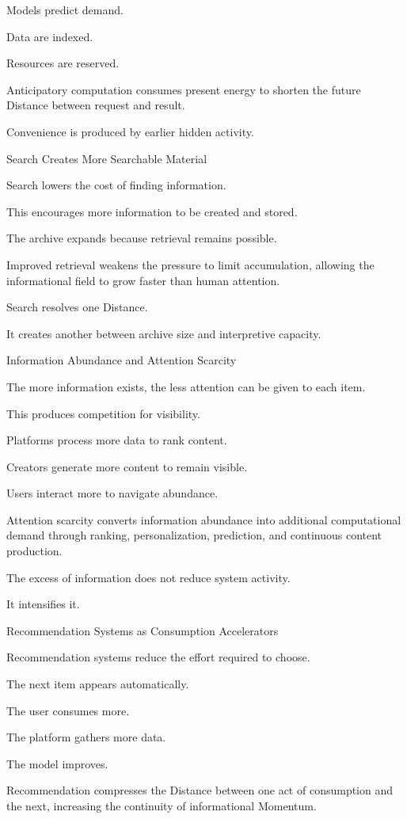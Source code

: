 Models predict demand.

Data are indexed.

Resources are reserved.

Anticipatory computation consumes present energy to shorten the future Distance between request and result.

Convenience is produced by earlier hidden activity.

Search Creates More Searchable Material

Search lowers the cost of finding information.

This encourages more information to be created and stored.

The archive expands because retrieval remains possible.

Improved retrieval weakens the pressure to limit accumulation, allowing the informational field to grow faster than human attention.

Search resolves one Distance.

It creates another between archive size and interpretive capacity.

Information Abundance and Attention Scarcity

The more information exists, the less attention can be given to each item.

This produces competition for visibility.

Platforms process more data to rank content.

Creators generate more content to remain visible.

Users interact more to navigate abundance.

Attention scarcity converts information abundance into additional computational demand through ranking, personalization, prediction, and continuous content production.

The excess of information does not reduce system activity.

It intensifies it.

Recommendation Systems as Consumption Accelerators

Recommendation systems reduce the effort required to choose.

The next item appears automatically.

The user consumes more.

The platform gathers more data.

The model improves.

Recommendation compresses the Distance between one act of consumption and the next, increasing the continuity of informational Momentum.

